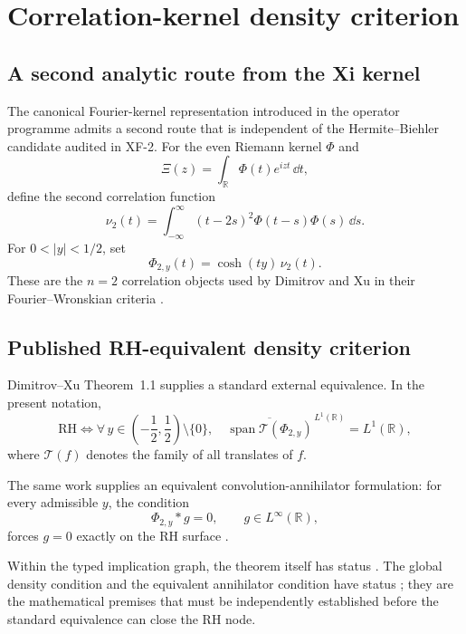 \chapter{Correlation-kernel density criterion}\label{ch:correlation-kernel}

\section{A second analytic route from the Xi kernel}

The canonical Fourier-kernel representation introduced in the operator programme admits a second route that is independent of the Hermite--Biehler candidate audited in XF-2.  For the even Riemann kernel $\Phi$ and
\[
\Xi(z)=\int_{\mathbb R}\Phi(t)e^{izt}\,\dd t,
\]
define the second correlation function
\begin{equation}\label{eq:nu2-correlation}
\nu_2(t)
=
\int_{-\infty}^{\infty}
(t-2s)^2\Phi(t-s)\Phi(s)\,\dd s.
\end{equation}
For $0<|y|<1/2$, set
\begin{equation}\label{eq:phi2y-correlation}
\Phi_{2,y}(t)=\cosh(ty)\,\nu_2(t).
\end{equation}
These are the $n=2$ correlation objects used by Dimitrov and Xu in their Fourier--Wronskian criteria \cite{DimitrovXu2016}.

\section{Published RH-equivalent density criterion}

Dimitrov--Xu Theorem~1.1 supplies a standard external equivalence.  In the present notation,
\begin{equation}\label{eq:dx-density-rh}
\boxed{
\mathrm{RH}
\iff
\forall\,y\in\left(-\frac12,\frac12\right)\setminus\{0\},\quad
\overline{\operatorname{span}\mathcal T(\Phi_{2,y})}^{\,L^1(\mathbb R)}
=L^1(\mathbb R),
}
\end{equation}
where $\mathcal T(f)$ denotes the family of all translates of $f$.

The same work supplies an equivalent convolution-annihilator formulation: for every admissible $y$, the condition
\begin{equation}\label{eq:dx-annihilator}
\Phi_{2,y}*g=0,\qquad g\in L^\infty(\mathbb R),
\end{equation}
forces $g=0$ exactly on the RH surface \cite{DimitrovXu2016}.

Within the typed implication graph, the theorem itself has status .  The global density condition and the equivalent annihilator condition have status ; they are the mathematical premises that must be independently established before the standard equivalence can close the RH node.

